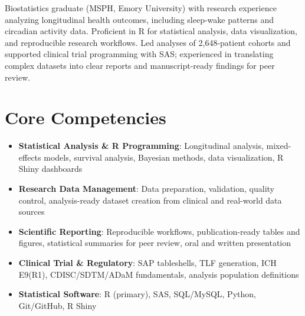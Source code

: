\documentclass[11pt,a4paper,sans]{moderncv}
\begin{document}
\makecvtitle

\vspace{6pt}
\small{Biostatistics graduate (MSPH, Emory University) with research experience analyzing longitudinal health outcomes, including sleep-wake patterns and circadian activity data. Proficient in R for statistical analysis, data visualization, and reproducible research workflows. Led analyses of 2,648-patient cohorts and supported clinical trial programming with SAS; experienced in translating complex datasets into clear reports and manuscript-ready findings for peer review.}

\section{Core Competencies}
\vspace{1pt}
\begin{itemize}
\item \textbf{Statistical Analysis \& R Programming}: Longitudinal analysis, mixed-effects models, survival analysis, Bayesian methods, data visualization, R Shiny dashboards
\item \textbf{Research Data Management}: Data preparation, validation, quality control, analysis-ready dataset creation from clinical and real-world data sources
\item \textbf{Scientific Reporting}: Reproducible workflows, publication-ready tables and figures, statistical summaries for peer review, oral and written presentation
\item \textbf{Clinical Trial \& Regulatory}: SAP tableshells, TLF generation, ICH E9(R1), CDISC/SDTM/ADaM fundamentals, analysis population definitions
\item \textbf{Statistical Software}: R (primary), SAS, SQL/MySQL, Python, Git/GitHub, R Shiny
\end{itemize}
\end{document}
